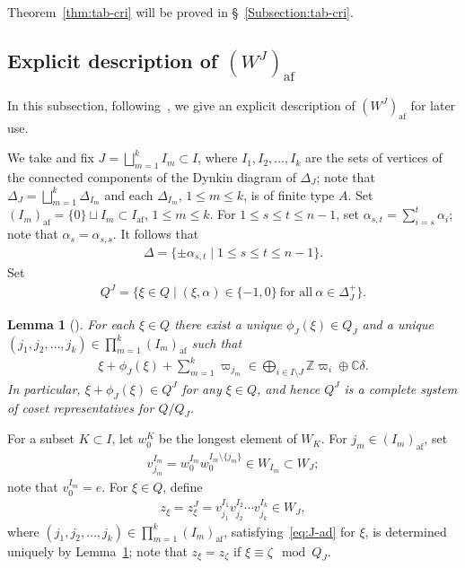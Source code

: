 \documentclass[10pt]{amsart}
\newtheorem{lemm}[theo]{Lemma}
\theoremstyle{definition}\newtheorem{defi}[theo]{Definition}
\theoremstyle{remark}\newtheorem{rema}[theo]{Remark}
\newcommand{\BC}{\mathbb{C}}
\newcommand{\BZ}{\mathbb{Z}}
\DeclareMathOperator{\af}{af}
\begin{document}
Theorem~\ref{thm:tab-cri} will be proved in \S~\ref{Subsection:tab-cri}.

\subsection{Explicit description of \texorpdfstring{$(W^J)_{\mathrm{af}}$}{(W J) af}}

In this subsection, 
following~\cite[\S~3]{LNSSS15}, 
we give an explicit description of 
$(W^J)_{\af}$ 
for later use. 

We take and fix $J = \bigsqcup_{m=1}^k I_m \subset I$, 
where $I_1 , I_2 , \ldots , I_k$ are the sets of vertices 
of the connected components of the Dynkin diagram of $\Delta_J$; 
note that 
$\Delta_J = \bigsqcup_{m=1}^k \Delta_{I_m}$ 
and each 
$\Delta_{I_m}$, $1 \leq m \leq k$, 
is of finite type $A$. 
Set 
$(I_m)_{\af} = \{ 0 \} \sqcup I_m \subset I_{\af}$, 
$1 \leq m \leq k$.
For $1 \leq s \leq t \leq n-1$, set 
$\alpha_{s,t} = \sum_{i=s}^t \alpha_i$; 
note that
$\alpha_s = \alpha_{s,s}$.
It follows that 
\begin{align} \label{eq:root-A}
\Delta = \{ \pm \alpha_{s,t} \mid 1 \leq s \leq t \leq n-1 \} .
\end{align}
Set 
\begin{align}
Q^J = \{ \xi \in Q \mid (\xi,\alpha) \in \{ -1,0\} \ \text{for all} \ \alpha \in \Delta_J^+ \} .
\end{align}

\begin{lemm}[{\cite[Equation~(3.6)]{LNSSS15}}] \label{lem:J-ad}
For each $\xi \in Q$ there exist a unique
$\phi_J(\xi) \in Q_J$ 
and a unique 
$(j_1, j_2 , \ldots , j_k) \in \prod_{m=1}^k (I_m)_{\af}$ 
such that 
\begin{align} \label{eq:J-ad}
\xi + \phi_J(\xi) + \sum_{m=1}^k \varpi_{j_m} \in \bigoplus_{i \in I \setminus J} \BZ \varpi_i \oplus \BC \delta.
\end{align}
In particular, $\xi + \phi_J(\xi) \in Q^J$ for any $\xi \in Q$, 
and hence $Q^J$ is a complete system of coset representatives for $Q/Q_J$. 
\end{lemm}

For a subset 
$K \subset I$, 
let 
$w_0^K$ 
be the longest element of 
$W_K$.
For $j_m \in (I_m)_{\af}$, set 
\begin{align}
v_{j_m}^{I_m} = w_0^{I_m} w_0^{I_m \setminus \{ j_m \}} \in W_{I_m} \subset W_J; 
\end{align}
note that $v^{I_m}_0 = e$.
For $\xi \in Q$, define
\begin{align} \label{eq:z}
z_{\xi} = z_{\xi}^J = v_{j_1}^{I_1} v_{j_2}^{I_2} \cdots v_{j_k}^{I_k} \in W_J,
\end{align}
where 
$(j_1, j_2 , \ldots , j_k) \in \prod_{m=1}^k (I_m)_{\af}$, 
satisfying~\eqref{eq:J-ad} for $\xi$, 
is determined uniquely by Lemma~\ref{lem:J-ad}; 
note that 
$z_{\xi} = z_{\zeta}$ 
if 
$\xi \equiv \zeta \mod Q_J$.
\end{document}
